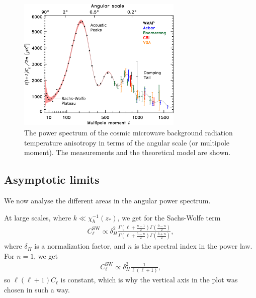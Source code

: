 \begin{figure}
	\centering
	\includegraphics[width=0.7\textwidth]{img/ch-03/power-spectrum.pdf}
	\caption{The power spectrum of the cosmic microwave background radiation temperature anisotropy in terms of the angular scale (or multipole moment). The measurements and the theoretical model are shown.}
	\label{fig:power-spectrum}
\end{figure}

\subsection{Asymptotic limits}
We now analyse the different areas in the angular power spectrum.

At large scales, where $k \ll \chi_h^{-1}(z_*)$, we get for the Sachs-Wolfe term
\begin{align*}
	C_\ell^\text{SW} \propto \delta_H^2 \frac{
	\Gamma\left(\ell+\frac{n-1}{2}\right)
	\Gamma\left(\frac{9-n}{2}\right) 
	}{
	\Gamma\left(\ell+\frac{5-n}{2}\right)
	\Gamma\left(\frac{3+n}{2}\right)
	},
\end{align*}
where $\delta_H$ is a normalization factor, and $n$ is the spectral index in the power law. For $n=1$, we get
\begin{align*}
	C_\ell^{\text{SW}} \propto \delta_H^2 \frac{1}{\ell(\ell+1)},
\end{align*}
so $\ell(\ell+1) C_\ell$ is constant, which is why the vertical axis in the plot was chosen in such a way.

